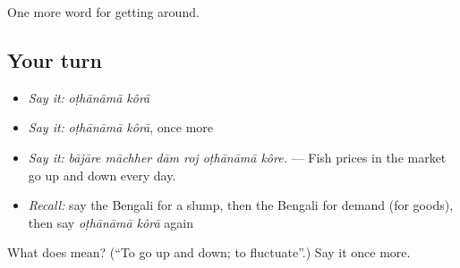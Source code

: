 \begin{grammarlens}[title={What you've built}]
One more word for getting around.
\end{grammarlens}

\subsection*{Your turn}
\begin{itemize}
\raggedright
  \item \emph{Say it:} \emph{oṭhānāmā kôrā}
  \item \emph{Say it:} \emph{oṭhānāmā kôrā}, once more
  \item \emph{Say it:} \emph{bājāre māchher dām roj oṭhānāmā kôre.} — Fish prices in the market go up and down every day.
  \item \emph{Recall:} say the Bengali for a slump, then the Bengali for demand (for goods), then say \emph{oṭhānāmā kôrā} again
\end{itemize}

\begin{tcolorbox}[breakable,colback=teal!4,colframe=teal!35!black,title={Before you move on}]
What does   mean? (\textquotedblleft{}To go up and down; to fluctuate\textquotedblright{}.) Say it once more.
\end{tcolorbox}
